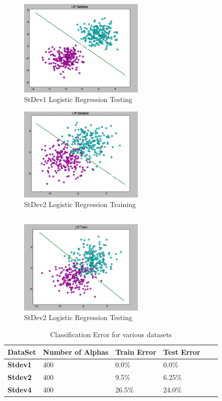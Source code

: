\documentclass[pageno]{jpaper}
\begin{document}
\subsection{}
\begin{figure}[ht!]
\centering
\includegraphics[width=60mm]{stdev1_lr_test}
\caption{StDev1 Logistic Regression Testing}
\label{overflow}
\end{figure}
\begin{figure}[ht!]
\centering
\includegraphics[width=60mm]{sdev2_lr_train}
\caption{StDev2 Logistic Regression Training}
\label{overflow}
\end{figure}
\subsection{}
\begin{figure}[ht!]
\centering
\includegraphics[width=60mm]{stdev2_lr_test}
\caption{StDev2 Logistic Regression Testing}
\label{overflow}
\end{figure}

\begin{table}[h!]
  \centering
  \begin{tabular}{llllll|}
    \hline
     \textbf{DataSet}  & \textbf{Number of Alphas} &\textbf{Train Error} & \textbf{Test Error}\\
    \hline
    \hline
 \textbf{Stdev1} 	   &400 &0.0\% & 0.0\%\\
 \hline
\textbf{Stdev2}	 &400 & 9.5\% &6.25\% \\
 \hline
\textbf{Stdev4}	 &400 &26.5\% & 24.0\%\\
 \hline
 
  \end{tabular}
  \caption{Classification Error for various datasets}
  \label{table:formatting}
\end{table}
\end{document}
